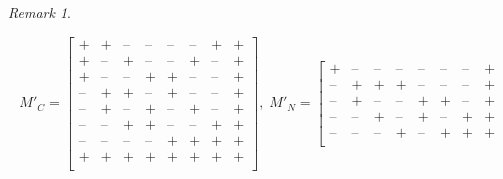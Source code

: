 \documentclass[11pt]{amsart}
\theoremstyle{plain}
\theoremstyle{definition}
\theoremstyle{remark}
\newtheorem{rmk}[theorem]{Remark}
\numberwithin{equation}{subsection}
\begin{document}
\begin{rmk}
\begin{enumerate}
         \[ M'_C = \left[
                     \begin{matrix} {\text{+}} & {\text{+}} & {\text{--}} &
                         {\text{--}} & {\text{--}} & {\text{--}} &
                         {\text{+}} & {\text{+}}\\ {\text{+}} & {\text{--}}
                         & {\text{+}} & {\text{--}} & {\text{--}} &
                         {\text{+}} & {\text{--}} & {\text{+}}\\ {\text{+}}
                         & {\text{--}} & {\text{--}} & {\text{+}} &
                         {\text{+}} & {\text{--}} & {\text{--}} &
                         {\text{+}}\\ {\text{--}} & {\text{+}} & {\text{+}}
                         & {\text{--}} & {\text{+}} & {\text{--}} &
                         {\text{--}} & {\text{+}}\\ {\text{--}} & {\text{+}}
                         & {\text{--}} & {\text{+}} & {\text{--}} &
                         {\text{+}} & {\text{--}} & {\text{+}}\\ {\text{--}}
                         & {\text{--}} & {\text{+}} & {\text{+}} &
                         {\text{--}} & {\text{--}} & {\text{+}} &
                         {\text{+}}\\ {\text{--}} & {\text{--}} &
                         {\text{--}} & {\text{--}} & {\text{+}} & {\text{+}}
                         & {\text{+}} & {\text{+}}\\ {\text{+}} & {\text{+}}
                         & {\text{+}} & {\text{+}} & {\text{+}} & {\text{+}}
                         & {\text{+}} & {\text{+}}\\
                 \end{matrix} \right], \; M'_N = \left[ \begin{matrix}
    {\text{+}} & {\text{--}} & {\text{--}} & {\text{--}} & {\text{--}} &
    {\text{--}} & {\text{--}} & {\text{+}}\\ {\text{--}} & {\text{+}} &
    {\text{+}} & {\text{+}} & {\text{--}} & {\text{--}} & {\text{--}} &
    {\text{+}}\\ {\text{--}} & {\text{+}} & {\text{--}} & {\text{--}} &
    {\text{+}} & {\text{+}} & {\text{--}} & {\text{+}}\\ {\text{--}} &
    {\text{--}} & {\text{+}} & {\text{--}} & {\text{+}} & {\text{--}} &
    {\text{+}} & {\text{+}}\\ {\text{--}} & {\text{--}} & {\text{--}} &
    {\text{+}} & {\text{--}} & {\text{+}} & {\text{+}} & {\text{+}}\\

\end{matrix}\]
\end{enumerate}
\end{rmk}
\end{document}
